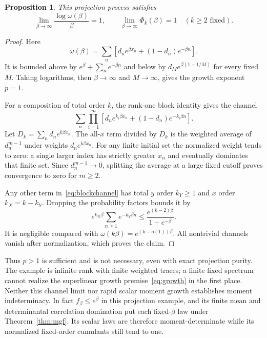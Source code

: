 \documentclass[11pt,a4paper]{article}
\newtheorem{proposition}[theorem]{Proposition}
\theoremstyle{remark}\newtheorem{remark}[theorem]{Remark}
\begin{document}
\begin{proposition}\label{prop:p1}
This projection process satisfies
\begin{equation}
 \lim_{\beta\to\infty}\frac{\log\omega(\beta)}\beta=1,
 \qquad\lim_{\beta\to\infty}\Phi_k(\beta)=1\quad(k\ge2\text{ fixed}).
\end{equation}
\end{proposition}
\begin{proof}
Here
\begin{equation}
 \omega(\beta)=\sum_n\left[d_ne^{\beta x_n}+(1-d_n)e^{-\beta n}\right].
\end{equation}
It is bounded above by $e^\beta+\sum_ne^{-\beta n}$ and below by $d_Me^{\beta(1-1/M)}$ for every fixed $M$.
Taking logarithms, then $\beta\to\infty$ and $M\to\infty$, gives the growth exponent $p=1$.

For a composition of total order $k$, the rank-one block identity gives the channel
\begin{equation}\label{eq:blockchannel}
 \sum_n\prod_{i=1}^m\left[d_ne^{k_i\beta x_n}+(1-d_n)e^{-k_i\beta n}\right].
\end{equation}
Let $D_k=\sum_n d_ne^{k\beta x_n}$.
The all-$x$ term divided by $D_k$ is the weighted average of $d_n^{m-1}$ under weights $d_ne^{k\beta x_n}$.
For any finite initial set the normalized weight tends to zero: a single larger index has strictly greater $x_n$ and eventually dominates that finite set.
Since $d_n^{m-1}\to0$, splitting the average at a large fixed cutoff proves convergence to zero for $m\ge2$.

Any other term in~\eqref{eq:blockchannel} has total $y$ order $k_Y\ge1$ and $x$ order $k_X=k-k_Y$.
Dropping the probability factors bounds it by
\begin{equation}
 e^{k_X\beta}\sum_{n\ge1}e^{-k_Y\beta n}
 \le\frac{e^{(k-2)\beta}}{1-e^{-\beta}}.
\end{equation}
It is negligible compared with $\omega(k\beta)=e^{(k-o(1))\beta}$.
All nontrivial channels vanish after normalization, which proves the claim.
\end{proof}

Thus $p>1$ is sufficient and is not necessary, even with exact projection purity.
The example is infinite rank with finite weighted traces; a finite fixed spectrum cannot realize the superlinear growth premise~\eqref{eq:growth} in the first place.
Neither this channel limit nor rapid scalar moment growth establishes moment indeterminacy.
In fact $f_\beta\le e^\beta$ in this projection example, and its finite mean and determinantal correlation domination put each fixed-$\beta$ law under Theorem~\ref{thm:mgf}.
Its scalar laws are therefore moment-determinate while its normalized fixed-order cumulants still tend to one.
\end{document}
